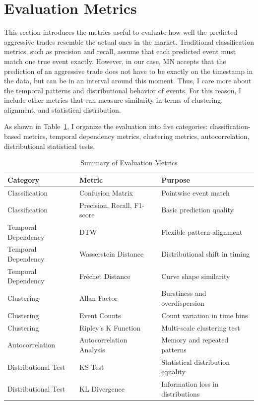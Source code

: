 \section{Evaluation Metrics} \label{sec:evaluation-metrics}
This section introduces the metrics useful to evaluate how well the predicted aggressive trades resemble the actual ones in the market. Traditional classification metrics, such as precision and recall, assume that each predicted event must match one true event exactly. However, in our case, MN accepts that the prediction of an aggressive trade does not have to be exactly on the timestamp in the data, but can be in an interval around this moment. Thus, I care more about the temporal patterns and distributional behavior of events. For this reason, I include other metrics that can measure similarity in terms of clustering, alignment, and statistical distribution.

As shown in Table~\ref{tb:Evaluation Metrics}, I organize the evaluation into five categories: classification-based metrics, temporal dependency metrics, clustering metrics, autocorrelation, distributional statistical tests.

\begin{table}[h]
\centering
\begin{tabular}{|l|l|l|}
\hline
\textbf{Category} & \textbf{Metric} & \textbf{Purpose} \\
\hline
Classification & Confusion Matrix & Pointwise event match \\
Classification & Precision, Recall, F1-score & Basic prediction quality \\
Temporal Dependency & DTW & Flexible pattern alignment \\
Temporal Dependency & Wasserstein Distance & Distributional shift in timing \\
Temporal Dependency & Fréchet Distance & Curve shape similarity \\
Clustering & Allan Factor & Burstiness and overdispersion \\
Clustering & Event Counts & Count variation in time bins \\
Clustering & Ripley's K Function & Multi-scale clustering test \\
Autocorrelation & Autocorrelation Analysis & Memory and repeated patterns \\
Distributional Test & KS Test & Statistical distribution equality \\
Distributional Test & KL Divergence & Information loss in distributions \\
\hline
\end{tabular}
\caption{Summary of Evaluation Metrics}\label{tb:Evaluation Metrics}
\end{table}

